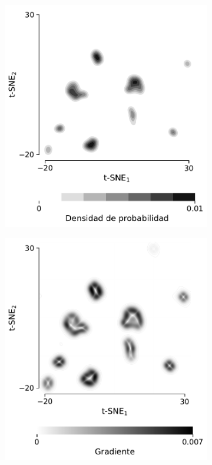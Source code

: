 \begin{figure}[!htbp]
    \centering
    \begin{subfigure}{.49\textwidth}
        \includegraphics[width=1\textwidth]{figuras/expertos/watershed/relief_sig_tsne1.0_foot30_cut20.pdf}
        \caption{}
    \end{subfigure}
    \begin{subfigure}{.49\textwidth}
        \includegraphics[width=1\textwidth]{figuras/expertos/watershed/gradient_sig_tsne1.0_foot30_cut20.pdf}

\end{subfigure}
\end{figure}
